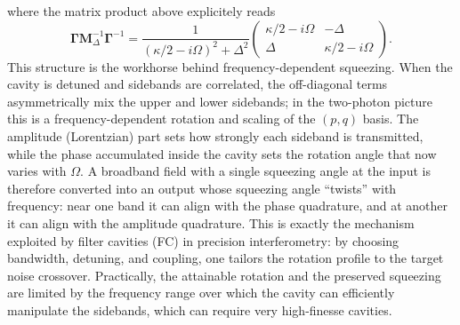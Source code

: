 where the matrix product above explicitely reads 
\begin{equation*}
  \mathbf{\Gamma}  \mathbf{M}^{-1}_\Delta \mathbf{\Gamma}^{-1}
= \frac{1}{\left(\kappa/2-i\Omega\right)^{2}+\Delta^{2}}
\begin{pmatrix}
\kappa/2-i\Omega & -\Delta \\[6pt]
\Delta & \kappa/2-i\Omega
\end{pmatrix}.
\end{equation*}
This structure is the workhorse behind frequency-dependent squeezing. When the cavity is detuned and sidebands are correlated, the off-diagonal terms asymmetrically mix the upper and lower sidebands; in the two-photon picture this is a frequency-dependent rotation and scaling of the $(p,q)$ basis. The amplitude (Lorentzian) part sets how strongly each sideband is transmitted, while the phase accumulated inside the cavity sets the rotation angle that now varies with $\Omega$. A broadband field with a single squeezing angle at the input is therefore converted into an output whose squeezing angle “twists” with frequency: near one band it can align with the phase quadrature, and at another it can align with the amplitude quadrature. This is exactly the mechanism exploited by filter cavities (FC) in precision interferometry: by choosing bandwidth, detuning, and coupling, one tailors the rotation profile to the target noise crossover. Practically, the attainable rotation and the preserved squeezing are limited by the frequency range over which the cavity can efficiently manipulate the sidebands, which can require very high-finesse cavities. \\

